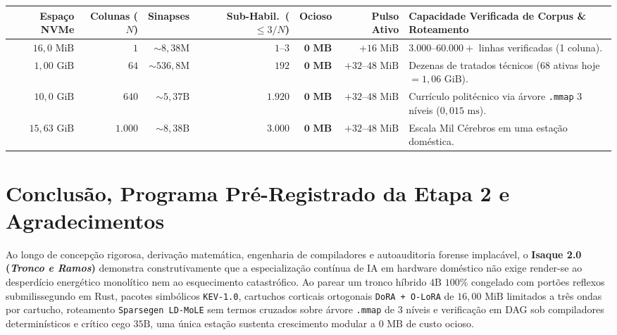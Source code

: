 \documentclass[10pt,a4paper]{article}
\begin{document}
\begin{table}[!htbp]
\vspace{4pt}
\begin{tabularx}{\linewidth}{@{}rrrrrrY@{}}
\toprule
\textbf{Espa\c{c}o NVMe} & \textbf{Colunas ($N$)} & \textbf{Sinapses} & \textbf{Sub-Habil.\ ($\le 3/N$)} & \textbf{Ocioso} & \textbf{Pulso Ativo} & \textbf{Capacidade Verificada de Corpus \& Roteamento} \\
\midrule
$16,0\text{ MiB}$  & $1$     & $\sim 8,38\text{M}$  & $1\text{--}3$       & $\mathbf{0\text{ MB}}$ & $+16\text{ MiB}$      & $3.000\text{--}60.000+$ linhas verificadas (1 coluna). \\
$1,00\text{ GiB}$  & $64$    & $\sim 536,8\text{M}$ & $192$               & $\mathbf{0\text{ MB}}$ & $+32\text{--}48\text{ MiB}$ & Dezenas de tratados t\'ecnicos ($68$ ativas hoje $= 1,06\text{ GiB}$). \\
$10,0\text{ GiB}$ & $640$   & $\sim 5,37\text{B}$  & $1.920$             & $\mathbf{0\text{ MB}}$ & $+32\text{--}48\text{ MiB}$ & Curr\'iculo polit\'ecnico via \'arvore \texttt{.mmap} 3 n\'iveis ($0,015\text{ ms}$). \\
$15,63\text{ GiB}$ & $1.000$ & $\sim 8,38\text{B}$  & $3.000$             & $\mathbf{0\text{ MB}}$ & $+32\text{--}48\text{ MiB}$ & Escala Mil C\'erebros em uma esta\c{c}\~ao dom\'estica. \\
\bottomrule
\end{tabularx}
\end{table}

\section{Conclus\~ao, Programa Pr\'e-Registrado da Etapa 2 e Agradecimentos}

Ao longo de concep\c{c}\~ao rigorosa, deriva\c{c}\~ao matem\'atica, engenharia de compiladores e autoauditoria forense implac\'avel, o \textbf{Isaque 2.0 (\textit{Tronco e Ramos})} demonstra construtivamente que a especializa\c{c}\~ao cont\'inua de IA em hardware dom\'estico n\~ao exige render-se ao desperd\'icio energ\'etico monol\'itico nem ao esquecimento catastr\'ofico. Ao parear um tronco h\'ibrido $4\text{B}$ $100\%$ congelado com port\~oes reflexos submilissegundo em Rust, pacotes simb\'olicos \texttt{KEV-1.0}, cartuchos corticais ortogonais \texttt{DoRA + O-LoRA} de $16,00\text{ MiB}$ limitados a tr\^es ondas por cartucho, roteamento \texttt{Sparsegen LD-MoLE} sem termos cruzados sobre \'arvore \texttt{.mmap} de 3 n\'iveis e verifica\c{c}\~ao em DAG sob compiladores determin\'isticos e cr\'itico cego $35\text{B}$, uma \'unica esta\c{c}\~ao sustenta crescimento modular a $0\text{ MB}$ de custo ocioso.
\end{document}
